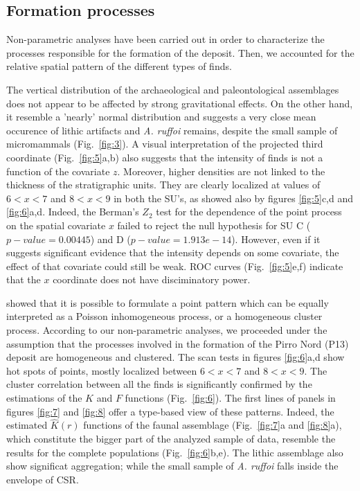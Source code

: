 \documentclass[review,authoryear]{elsarticle} %
\begin{document}
\subsection{Formation processes}

Non-parametric analyses have been carried out in order to characterize the processes responsible for the formation of the deposit. Then, we accounted for the relative spatial pattern of the different types of finds.

The vertical distribution of the archaeological and paleontological assemblages does not appear to be affected by strong gravitational effects. On the other hand, it resemble a 'nearly' normal distribution and suggests a very close mean occurence of lithic artifacts and \emph{A. ruffoi} remains, despite the small sample of micromammals (Fig.~\ref{fig:3}). A visual interpretation of the projected third coordinate (Fig.~\ref{fig:5}a,b) also suggests that the intensity of finds is not a function of the covariate $z$. Moreover, higher densities are not linked to the thickness of the stratigraphic units. They are clearly localized at values of $6<x<7$ and $8<x<9$ in both the SU's, as showed also by figures \ref{fig:5}c,d and \ref{fig:6}a,d. Indeed, the Berman's $Z_2$ test for the dependence of the point process on the spatial covariate $x$ failed to reject the null hypothesis for SU C ($p-value=0.00445$) and D ($p-value=1.913e-14$). However, even if it suggests significant evidence that the intensity depends on some covariate, the effect of that covariate could still be weak. ROC curves (Fig.~\ref{fig:5}e,f) indicate that the $x$ coordinate does not have disciminatory power.

\cite{Bartlett1963} showed that it is possible to formulate a point pattern which can be equally interpreted as a Poisson inhomogeneous process, or a homogeneous cluster process. According to our non-parametric analyses, we proceeded under the assumption that the processes involved in the formation of the Pirro Nord (P13) deposit are homogeneous and clustered. The scan tests in figures \ref{fig:6}a,d show hot spots of points, mostly localized between $6<x<7$ and $8<x<9$. The cluster correlation between all the finds is significantly confirmed by the estimations of the $K$ and $F$ functions (Fig.~\ref{fig:6}). The first lines of panels in figures \ref{fig:7} and \ref{fig:8} offer a type-based view of these patterns. Indeed, the estimated $\hat K(r)$ functions of the faunal assemblage (Fig.~\ref{fig:7}a and \ref{fig:8}a), which constitute the bigger part of the analyzed sample of data, resemble the results for the complete populations (Fig.~\ref{fig:6}b,e). The lithic assemblage also show significat aggregation; while the small sample of \emph{A. ruffoi} falls inside the envelope of CSR.
\end{document}
